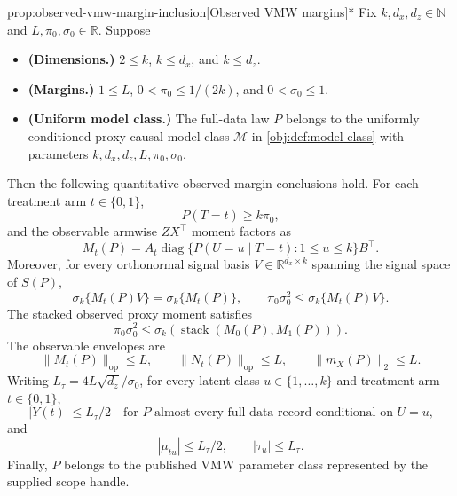 \begin{propositionv}{prop:observed-vmw-margin-inclusion}[Observed VMW margins]*
Fix \(k,d_x,d_z\in\mathbb N\) and \(L,\pi_0,\sigma_0\in\mathbb R\).  Suppose
\begin{itemize}
\item \textbf{(Dimensions.)} \(2\le k\), \(k\le d_x\), and \(k\le d_z\).
\item \textbf{(Margins.)} \(1\le L\), \(0<\pi_0\le 1/(2k)\), and \(0<\sigma_0\le 1\).
\item \textbf{(Uniform model class.)} The full-data law \(P\) belongs to the uniformly conditioned proxy causal model class \(\mathcal M\) in \cref{obj:def:model-class} with parameters \(k,d_x,d_z,L,\pi_0,\sigma_0\).
\end{itemize}
Then the following quantitative observed-margin conclusions hold.  For each treatment arm \(t\in\{0,1\}\),
\[
P(T=t)\ge k\pi_0,
\]
and the observable armwise \(ZX^\top\) moment factors as
\[
M_t(P)
=
A_t\operatorname{diag}\{P(U=u\mid T=t):1\le u\le k\}B^\top .
\]
Moreover, for every orthonormal signal basis \(V\in\mathbb R^{d_x\times k}\) spanning the signal space of \(S(P)\),
\[
\sigma_k\{M_t(P)V\}
=
\sigma_k\{M_t(P)\},
\qquad
\pi_0\sigma_0^2\le \sigma_k\{M_t(P)V\}.
\]
The stacked observed proxy moment satisfies
\[
\pi_0\sigma_0^2
\le
\sigma_k\!\left(\operatorname{stack}(M_0(P),M_1(P))\right).
\]
The observable envelopes are
\[
\|M_t(P)\|_{\mathrm{op}}\le L,
\qquad
\|N_t(P)\|_{\mathrm{op}}\le L,
\qquad
\|m_X(P)\|_2\le L .
\]
Writing \(L_\tau=4L\sqrt{d_z}/\sigma_0\), for every latent class \(u\in\{1,\ldots,k\}\) and treatment arm \(t\in\{0,1\}\),
\[
|Y(t)|\le L_\tau/2
\quad\text{for \(P\)-almost every full-data record conditional on \(U=u\),}
\]
and
\[
|\mu_{tu}|\le L_\tau/2,
\qquad
|\tau_u|\le L_\tau .
\]
Finally, \(P\) belongs to the published VMW parameter class represented by the supplied scope handle.
\end{propositionv}

